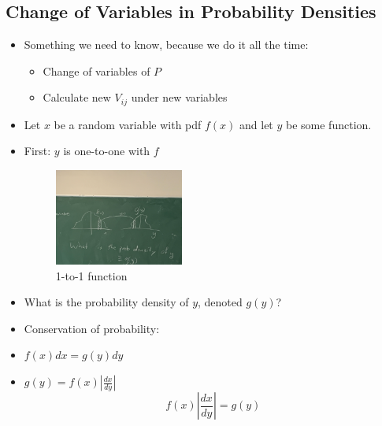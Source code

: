\subsection{Change of Variables in Probability Densities}
\begin{itemize}
      \item Something we need to know, because we do it all the time:
            \begin{itemize}
                  \item Change of variables of $P$
                  \item Calculate new $V_{ij}$ under new variables
            \end{itemize}

      \item Let $x$ be a random variable with pdf $f(x)$ and let $y$ be some function.
      \item First: $y$ is one-to-one with $f$

            \begin{figure}[h]
                  \centering
                  \includegraphics[width=0.4\textwidth]{Images/lec4-fig1.jpg}
                  \caption{1-to-1 function}
                  \label{fig:fig1}
            \end{figure}

      \item What is the probability density of $y$, denoted $g(y)$?
      \item Conservation of probability:
      \item $f(x) dx = g(y) dy$
      \item $g(y) = f(x) \left| \frac{dx}{dy} \right|$
            \[ \boxed{ f(x) \left| \frac{dx}{dy} \right| = g(y) } \]
\end{itemize}

